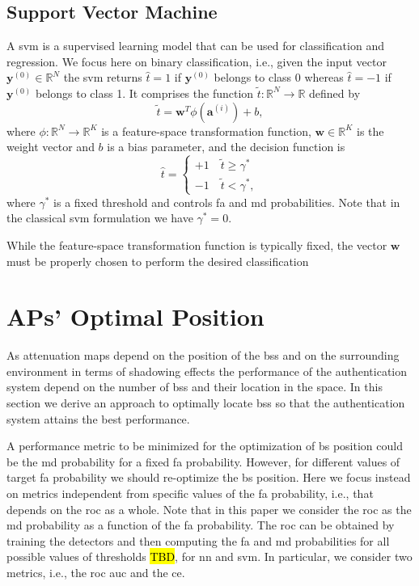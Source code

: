 \documentclass[twocolumns]{IEEEtran}
\begin{document}
\subsection{Support Vector Machine}\label{sec:svm}
A \ac{svm} \cite{Bishop2006} is a supervised learning model that can be used for classification and regression. We focus here on binary classification, i.e., given the input vector $\bm{y}^{(0)} \in \mathbb{R}^N$ the \ac{svm} returns $\hat{t} = 1$ if $\bm{y}^{(0)}$ belongs to class 0 whereas $\hat{t}=-1$ if $\bm{y}^{(0)}$ belongs to class 1. It comprises the function $\tilde{t}: \mathbb{R}^N \to \mathbb{R}$ defined by
\begin{equation}
\label{eq:svm}
\tilde{t} = \mathbf{w}^T \phi (\mathbf{a}^{(i)}) + b,
\end{equation}
where $\phi: \mathbb{R}^N \to \mathbb{R}^K$ is a feature-space transformation function, $\mathbf{w} \in \mathbb{R}^K$ is the weight vector and $b$ is a bias parameter, and the decision function is
\begin{equation}
\label{eq:cases}
\hat{t} = 
\begin{cases}
+1 \quad \tilde{t}  \geq \gamma^* \\
-1 \quad \tilde{t}  < \gamma^*,
\end{cases}		
\end{equation} 
where $\gamma^*$ is a fixed threshold and controls \ac{fa} and \ac{md} probabilities. Note that in the classical \ac{svm} formulation we have $\gamma^* = 0$.

While the feature-space transformation function is typically fixed, the vector $\mathbf{w}$ must be properly chosen to perform the desired classification


\section{APs' Optimal Position}\label{sec:bsPos}



As attenuation maps depend on the position of the \acp{bs} and on the surrounding environment in terms of shadowing effects the performance of the authentication system depend on the number of \acp{bs} and their location in the space. In this section we derive an approach to optimally locate \acp{bs} so that the authentication system attains the best performance. 

A performance metric to be minimized for the optimization of \ac{bs} position could be the \ac{md} probability for a fixed \ac{fa} probability. However, for different values of target \ac{fa} probability we should re-optimize the \ac{bs} position. Here we focus instead on metrics independent from specific values of the \ac{fa} probability, i.e., that depends on the \ac{roc} as a whole. Note that in this paper we consider the \ac{roc} as the \ac{md} probability as a function of the \ac{fa} probability. The \ac{roc} can be obtained by training the detectors and then computing the \ac{fa} and \ac{md} probabilities for all possible values of thresholds \hl{TBD}, for \ac{nn} and \ac{svm}. In particular, we consider two metrics, i.e., the   \ac{roc} \ac{auc} \cite{hanley-82} and the  \ac{ce}.
\end{document}
